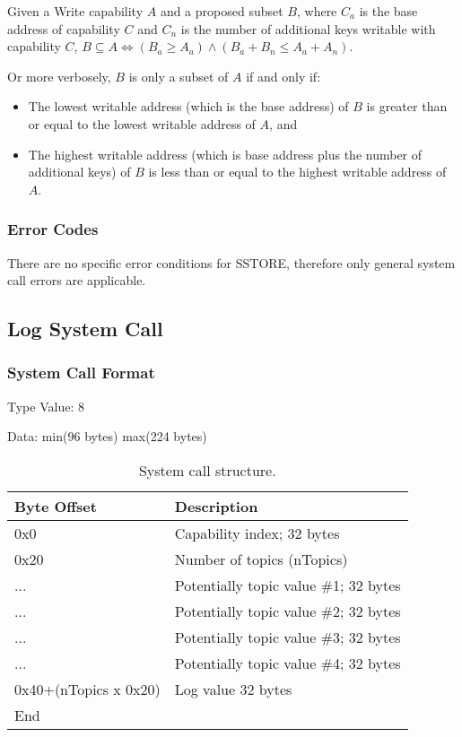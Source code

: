\documentclass[english,a4paper]{article}
\let\oldparagraph\subsubsection
\renewcommand{\subsubsection}[1]{\oldparagraph{#1}\mbox{}}
\begin{document}
Given a Write capability $A$ and a proposed subset $B$, where $C_a$ is the base
address of capability $C$ and $C_n$ is the number of additional keys writable
with capability $C$, $B \subseteq A \iff \left(B_a \geq A_a\right) \land
\left(B_a + B_n \leq A_a + A_n\right)$.

Or more verbosely, $B$ is only a subset of $A$ if and only if:
\begin{itemize}
  \item The lowest writable address (which is the base address) of $B$ is
  greater than or equal to the lowest writable address of $A$, and
  \item The highest writable address (which is base address plus the number of
  additional keys) of $B$ is less than or equal to the highest writable address
  of $A$.
\end{itemize}

\subsubsection{Error Codes}
There are no specific error conditions for SSTORE, therefore only general system
call errors are applicable.

\subsection{Log System Call}

\subsubsection{System Call Format}
Type Value: 8

Data: min(96 bytes) max(224 bytes)

\begin{table}[H]
  \caption{System call structure.}
  \centering{}%
  \begin{tabular}{l|p{}}
    \hline
    Byte Offset & Description\tabularnewline
    \hline
    \hline
    0x0 & Capability index; 32 bytes \tabularnewline
    0x20 & Number of topics (nTopics) \tabularnewline
    ... & Potentially topic value \#1; 32 bytes \tabularnewline
    ... & Potentially topic value \#2; 32 bytes \tabularnewline
    ... & Potentially topic value \#3; 32 bytes \tabularnewline
    ... & Potentially topic value \#4; 32 bytes \tabularnewline
    0x40+(nTopics x 0x20) & Log value 32 bytes \tabularnewline
    \hline
    End &  \tabularnewline
    \hline
  \end{tabular}
\end{table}
\end{document}
